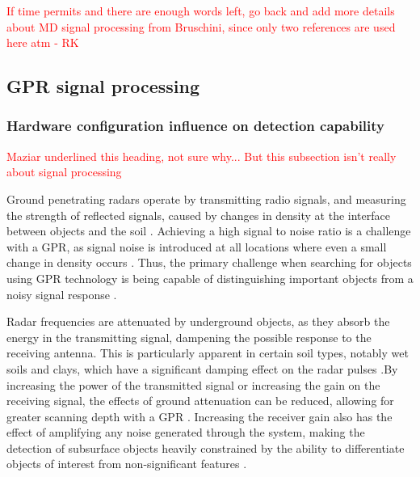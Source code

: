 \documentclass[main.tex]{subfiles}
\begin{document}
\textcolor{red}{If time permits and there are enough words left, go back and add more details about MD signal processing from Bruschini, since only two references are used here atm - RK}

\subsection{GPR signal processing}
\subsubsection{Hardware configuration influence on detection capability}
\textcolor{red}{Maziar underlined this heading, not sure why... But this subsection isn't really about signal processing}

Ground penetrating radars operate by transmitting radio signals, and measuring the strength of reflected signals, caused by changes in density at the interface between objects and the soil \parencite{sakaguchi2014}. Achieving a high signal to noise ratio is a challenge with a GPR, as signal noise is introduced at all locations where even a small change in density occurs \parencite{shresta2003}. Thus, the primary challenge when searching for objects using GPR technology is being capable of distinguishing important objects from a noisy signal response \parencite{sakaguchi2014}.

Radar frequencies are attenuated by underground objects, as they absorb the energy in the transmitting signal, dampening the possible response to the receiving antenna. This is particularly apparent in certain soil types, notably wet soils and clays, which have a significant damping effect on the radar pulses \parencite{sakaguchi2014}.By increasing the power of the transmitted signal or increasing the gain on the receiving signal, the effects of ground attenuation can be reduced, allowing for greater scanning depth with a GPR \parencite{Ho2008}. Increasing the receiver gain also has the effect of amplifying any noise generated through the system, making the detection of subsurface objects heavily constrained by the ability to differentiate objects of interest from non-significant features \parencite{shresta2003}. 
\end{document}
